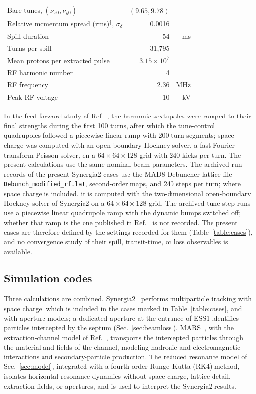 \documentclass[a4paper,fleqn]{cas-sc}
\begin{document}
\begin{table}[width=\linewidth,cols=3,pos=htbp]
\begin{tabular*}{\tblwidth}{@{} LRR@{}}
    Bare tunes, $(\nu_{x0},\nu_{y0})$ & $(9.65,9.78)$ & \\
    Relative momentum spread (rms)$^{\ddagger}$, $\sigma_{\delta}$ & 0.0016 & \\
    Spill duration & 54 & ms \\
    Turns per spill & 31,795 & \\
    Mean protons per extracted pulse & $3.15\times10^{7}$ & \\
    RF harmonic number & 4 & \\
    RF frequency & 2.36 & MHz \\
    Peak RF voltage & 10 & kV \\
    \bottomrule
  \end{tabular*}
\end{table}

In the feed-forward study of Ref.~\cite{mu2e}, the harmonic sextupoles were ramped to their final strengths during the first 100 turns, after which the tune-control quadrupoles followed a piecewise linear ramp with 200-turn segments; space charge was computed with an open-boundary Hockney solver, a fast-Fourier-transform Poisson solver, on a $64\times64\times128$ grid with 240 kicks per turn. The present calculations use the same nominal beam parameters. The archived run records of the present Synergia2 cases use the MAD8 Debuncher lattice file \texttt{Debunch\_modified\_rf.lat}, second-order maps, and 240 steps per turn; where space charge is included, it is computed with the two-dimensional open-boundary Hockney solver of Synergia2 on a $64\times64\times128$ grid. The archived tune-step runs use a piecewise linear quadrupole ramp with the dynamic bumps switched off; whether that ramp is the one published in Ref.~\cite{mu2e} is not recorded. The present cases are therefore defined by the settings recorded for them (Table~\ref{table:cases}), and no convergence study of their spill, transit-time, or loss observables is available.

\subsection{\label{sec:codes}Simulation codes}

Three calculations are combined. Synergia2~\cite{synergia2} performs multiparticle tracking with space charge, which is included in the cases marked in Table~\ref{table:cases}, and with aperture models; a dedicated aperture at the entrance of ESS1 identifies particles intercepted by the septum (Sec.~\ref{sec:beamloss}). MARS~\cite{mars2}, with the extraction-channel model of Ref.~\cite{mars1}, transports the intercepted particles through the material and fields of the channel, modeling hadronic and electromagnetic interactions and secondary-particle production. The reduced resonance model of Sec.~\ref{sec:model}, integrated with a fourth-order Runge--Kutta (RK4) method, isolates horizontal resonance dynamics without space charge, lattice detail, extraction fields, or apertures, and is used to interpret the Synergia2 results.
\end{document}
